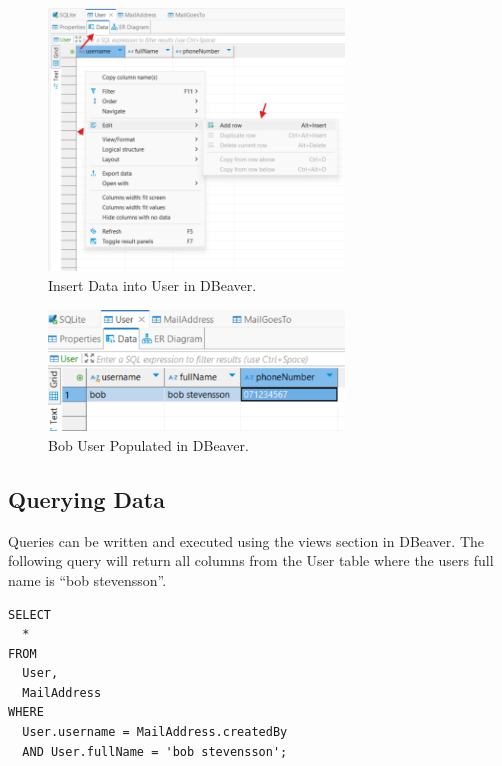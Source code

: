 \documentclass[a4paper,11pt,oneside]{article}
\begin{document}
\begin{sloppypar}
\begin{figure}[!htb]
  \centering
  \includegraphics[width=0.7\textwidth]{dbeaver/insert_data_user.png}
  \caption{Insert Data into User in DBeaver.}
  \label{fig:insert_data_user}
\end{figure}

\begin{figure}[!htb]
  \centering
  \includegraphics[width=0.7\textwidth]{dbeaver/insert_data_user_populated.png}
  \caption{Bob User Populated in DBeaver.}
  \label{fig:insert_data_user_populated}
\end{figure}


\subsection{Querying Data}
\label{dbeaverQueryingData}

Queries can be written and executed using the views section in DBeaver. The following query will return all columns from the User table where the users full name is ``bob stevensson''.

\begin{lstlisting}[caption={Querying Data in DBeaver}]
SELECT
  *
FROM
  User,
  MailAddress
WHERE
  User.username = MailAddress.createdBy
  AND User.fullName = 'bob stevensson';
\end{lstlisting}


\end{sloppypar}
\end{document}

